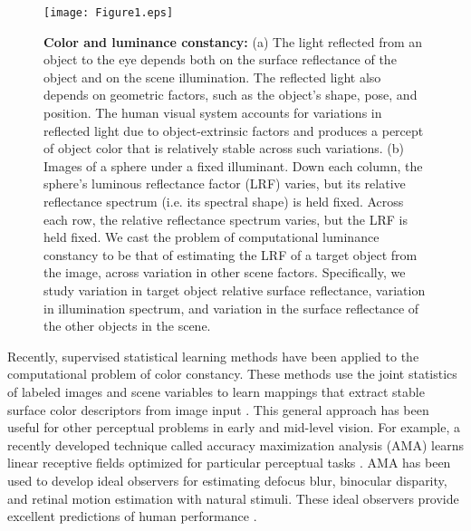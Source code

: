 \documentclass{jov}
\begin{document}
\begin{figure}
\centering
\texttt{[image: Figure1.eps]}    
    \caption{{\bf Color and luminance constancy:} (a)  The light reflected from an object to the eye depends both on the surface reflectance of the object and on the scene illumination. 
The reflected light also depends on geometric factors, such as the object's shape, pose, and position. 
The human visual system accounts for variations in reflected light due to object-extrinsic factors and produces a percept of object color that is relatively stable across such variations. 
(b) Images of a sphere under a fixed illuminant.  
Down each column, the sphere's luminous reflectance factor (LRF) varies, but its relative reflectance spectrum (i.e. its spectral shape) is held fixed.
Across each row, the relative reflectance spectrum varies, but the LRF is held fixed.
We cast the problem of computational luminance constancy to be that of estimating the LRF of a target object from the image, across variation in other scene factors. 
Specifically, we study variation in target object relative surface reflectance, variation in illumination spectrum, and variation in the surface reflectance of the other objects in the scene.}
\label{fig:introFigure}
 \end{figure}

Recently, supervised statistical learning methods have been applied to the computational problem of color constancy.
These methods use the joint statistics of labeled images and scene variables to learn mappings that extract stable surface color descriptors from image input \cite{barron2015convolutional}.
This general approach has been useful for other perceptual problems in early and mid-level vision.
For example, a recently developed technique called accuracy maximization analysis (AMA) learns linear receptive fields optimized for particular perceptual tasks \cite{geisler2009optimal,burge2017accuracy,jaini2017linking}. AMA has been used to develop ideal observers for estimating defocus blur, binocular disparity, and retinal motion estimation with natural stimuli. These ideal observers provide excellent predictions of human performance \cite{burge2011optimal, burge2012optimal, burge2014optimal, burge2015optimal}.
\end{document}
